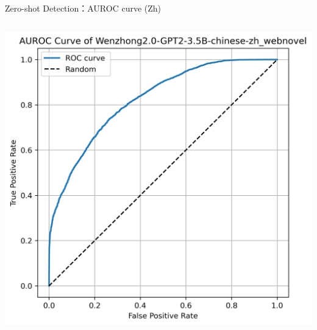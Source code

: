 \documentclass[serif]{beamer}
\begin{document}
\begin{frame}{Zero-shot Detection：AUROC curve (Zh)}
\begin{columns}[t]
    \centering
    \includegraphics[width=\linewidth]{images/Wenzhong2.0-GPT2-3.5B-chinese-zh_webnovel.png}


\end{columns}
\end{frame}
\end{document}
